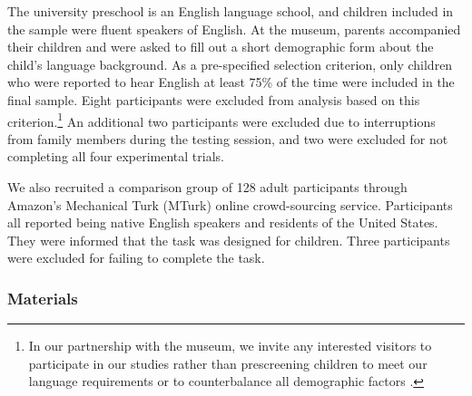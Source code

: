 \documentclass[man]{apa2}
\begin{document}
The university preschool is an English language school, and children included in the sample were fluent speakers of English. At the museum, parents accompanied their children and were asked to fill out a short demographic form about the child's language background. As a pre-specified selection criterion, only children who were reported to hear English at least 75\% of the time were included in the final sample.  Eight participants were excluded from analysis based on this criterion.\footnote{In our partnership with the museum, we invite any interested visitors to participate in our studies rather than prescreening children to meet our language requirements or to counterbalance all demographic factors \cite{callanan2012}. }  An additional two participants were excluded due to interruptions from family members during the testing session, and two were excluded for not completing all four experimental trials. 

We also recruited a comparison group of 128 adult participants through Amazon's Mechanical Turk (MTurk) online crowd-sourcing service.  Participants all reported being native English speakers and residents of the United States. They were informed that the task was designed for children. Three participants were excluded for failing to complete the task.  

\subsubsection{Materials}
\end{document}
